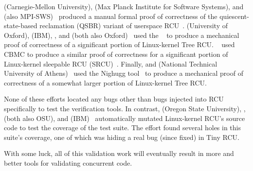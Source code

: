  (Carnegie-Mellon University),  (Max
Planck Institute for Software Systems), and 
(also MPI-SWS)~\cite{JosephTassarotti2015RCUproof}
produced a manual formal proof of correctness of the quiescent-state-based
reclamation (QSBR) variant of userspace
RCU~\cite{MathieuDesnoyers2009URCU,MathieuDesnoyers2012URCU}.
 (University of Oxford),  (IBM),
, and 
(both also Oxford)~\cite{LihaoLiang2016VerifyTreeRCU}
used the ~\cite{EdmundClarke2004CBMC}
to produce a mechanical proof of correctness of a significant portion
of Linux-kernel Tree RCU\@.
~\cite{LanceRoy2017CBMC-SRCU} used CBMC to produce a similar
proof of correctness for a significant portion of Linux-kernel
sleepable RCU (SRCU)~\cite{PaulEMcKenney2006c}.
Finally,  and 
(National Technical University of
Athens)~\cite{MichalisKokologiannakis2017NidhuggRCU,MichalisKokologiannakis2019RCUstatelessModelCheck}
used the Nighugg tool~\cite{CarlLeonardsson2014Nidhugg}
to produce a mechanical proof of correctness of a somewhat larger
portion of Linux-kernel Tree RCU\@.

None of these efforts located any bugs other than bugs injected into
RCU specifically to test the verification tools.
In contrast,
 (Oregon State University), ,
 (both also OSU), and 
(IBM)~\cite{Groce:2015:VMC:2916135.2916190}
automatically mutated Linux-kernel RCU's source code to test the
coverage of the  test suite.
The effort found several holes in this suite's coverage, one of which
was hiding a real bug (since fixed) in Tiny RCU\@.

With some luck, all of this validation work will eventually result in
more and better tools for validating concurrent code.
